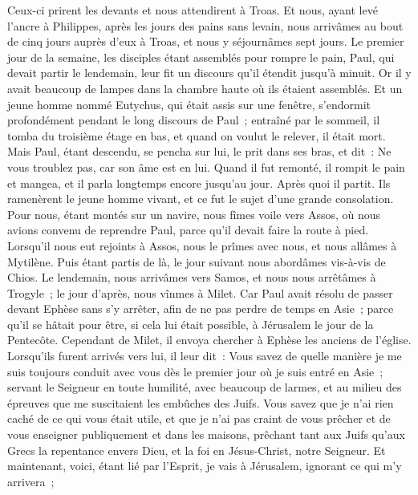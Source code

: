 \begin{multicols}{2}
Ceux-ci prirent les devants et nous attendirent à Troas.
Et nous, ayant levé l'ancre à Philippes, après les jours des pains sans levain, nous arrivâmes au bout de cinq jours auprès d'eux à Troas, et nous y séjournâmes sept jours.
Le premier jour de la semaine, les disciples étant assemblés pour rompre le pain, Paul, qui devait partir le lendemain, leur fit un discours qu'il étendit jusqu'à minuit.
Or il y avait beaucoup de lampes dans la chambre haute où ils étaient assemblés.
Et un jeune homme nommé Eutychus, qui était assis sur une fenêtre, s'endormit profondément pendant le long discours de Paul~; entraîné par le sommeil, il tomba du troisième étage en bas, et quand on voulut le relever, il était mort.
Mais Paul, étant descendu, se pencha sur lui, le prit dans ses bras, et dit~: Ne vous troublez pas, car son âme est en lui.
Quand il fut remonté, il rompit le pain et mangea, et il parla longtemps encore jusqu'au jour. Après quoi il partit.
Ils ramenèrent le jeune homme vivant, et ce fut le sujet d'une grande consolation.
Pour nous, étant montés sur un navire, nous fîmes voile vers Assos, où nous avions convenu de reprendre Paul, parce qu'il devait faire la route à pied.
Lorsqu'il nous eut rejoints à Assos, nous le prîmes avec nous, et nous allâmes à Mytilène.
Puis étant partis de là, le jour suivant nous abordâmes vis-à-vis de Chios. Le lendemain, nous arrivâmes vers Samos, et nous nous arrêtâmes à Trogyle~; le jour d'après, nous vînmes à Milet.
Car Paul avait résolu de passer devant Ephèse sans s'y arrêter, afin de ne pas perdre de temps en Asie~; parce qu'il se hâtait pour être, si cela lui était possible, à Jérusalem le jour de la Pentecôte.
Cependant de Milet, il envoya chercher à Ephèse les anciens de l'église.
Lorsqu'ils furent arrivés vers lui, il leur dit~: Vous savez de quelle manière je me suis toujours conduit avec vous dès le premier jour où je suis entré en Asie~;
servant le Seigneur en toute humilité, avec beaucoup de larmes, et au milieu des épreuves que me suscitaient les embûches des Juifs.
Vous savez que je n'ai rien caché de ce qui vous était utile, et que je n'ai pas craint de vous prêcher et de vous enseigner publiquement et dans les maisons,
prêchant tant aux Juifs qu'aux Grecs la repentance envers Dieu, et la foi en Jésus-Christ, notre Seigneur.
Et maintenant, voici, étant lié par l'Esprit, je vais à Jérusalem, ignorant ce qui m'y arrivera~;

\end{multicols}
